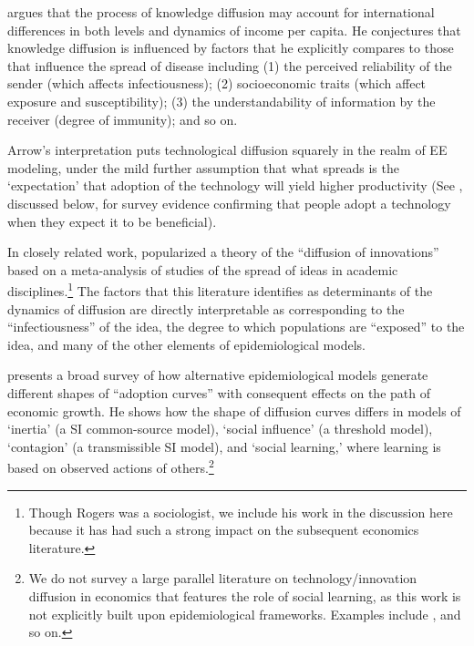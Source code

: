  argues that the process of knowledge diffusion may account for international differences in both levels and dynamics of income per capita. He conjectures that knowledge diffusion is influenced by factors that he explicitly compares to  those that influence the spread of disease including (1) the perceived reliability of the sender (which affects infectiousness); (2) socioeconomic traits (which affect exposure and susceptibility); (3) the understandability of information by the receiver (degree of immunity); and so on.

Arrow's interpretation puts technological diffusion squarely in the realm of EE modeling, under the mild further assumption that what spreads is the `expectation' that adoption of the technology will yield higher productivity (See \cite{banerjee2013diffusion}, discussed below, for survey evidence confirming that people adopt a technology when they expect it to be beneficial).

In closely related work,  popularized a theory of the ``diffusion of innovations'' based on a meta-analysis of studies of the spread of ideas in academic disciplines.\footnote{Though Rogers was a sociologist, we include his work in the discussion here because it has had such a strong impact on the subsequent economics literature.}  The factors that this literature identifies as determinants of the dynamics of diffusion are directly interpretable as corresponding to the ``infectiousness'' of the idea, the degree to which populations are ``exposed'' to the idea, and many of the other elements of epidemiological models.

 presents a broad survey of how alternative epidemiological models generate different shapes of  ``adoption curves'' with consequent effects on the path of economic growth. He shows how the shape of diffusion curves differs in models of `inertia' (a SI common-source model), `social influence' (a threshold model), `contagion' (a transmissible SI model), and `social learning,' where learning is based on observed actions of others.\footnote{We do not survey a large parallel literature on technology/innovation diffusion in economics that features the role of social learning, as this work is not explicitly built upon epidemiological frameworks. Examples include  \cite{munshi2004social},  \cite{comin2010exploration} and so on.}  %


